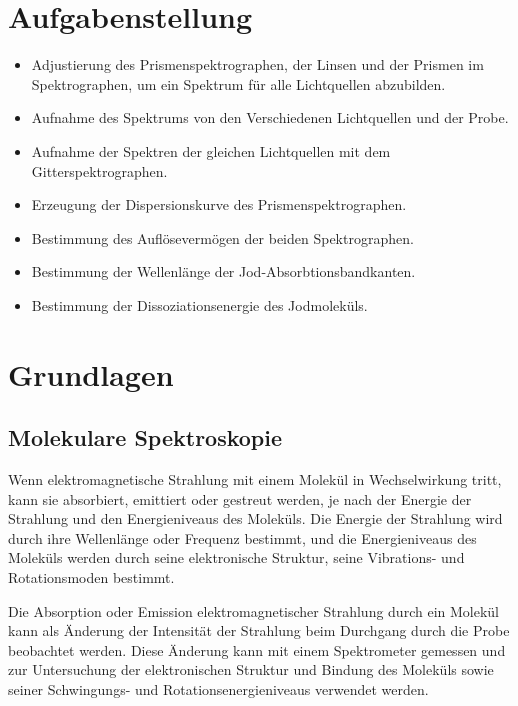 \documentclass[12pt,english,ngerman]{scrartcl}
\begin{document}
%
\section{Aufgabenstellung\label{sec:Aufgabenstellung}}

\begin{itemize}
	\item Adjustierung des Prismenspektrographen, der Linsen und der Prismen im
	      Spektrographen, um ein Spektrum für alle Lichtquellen abzubilden.
	\item Aufnahme des Spektrums von den Verschiedenen Lichtquellen und der Probe.
	\item Aufnahme der Spektren der gleichen Lichtquellen mit dem Gitterspektrographen.
	\item Erzeugung der Dispersionskurve des Prismenspektrographen.
	\item Bestimmung des Auflösevermögen der beiden Spektrographen.
	\item Bestimmung der Wellenlänge der Jod-Absorbtionsbandkanten.
	\item Bestimmung der Dissoziationsenergie des Jodmoleküls.
\end{itemize}

\section{Grundlagen}\label{sec:Grund}

\subsection{Molekulare Spektroskopie}

Wenn elektromagnetische Strahlung mit einem Molekül in Wechselwirkung tritt,
kann sie absorbiert, emittiert oder gestreut werden, je nach der Energie der
Strahlung und den Energieniveaus des Moleküls. Die Energie der Strahlung wird
durch ihre Wellenlänge oder Frequenz bestimmt, und die Energieniveaus des
Moleküls werden durch seine elektronische Struktur, seine Vibrations- und
Rotationsmoden bestimmt.

Die Absorption oder Emission elektromagnetischer Strahlung durch ein Molekül
kann als Änderung der Intensität der Strahlung beim Durchgang durch die Probe
beobachtet werden. Diese Änderung kann mit einem Spektrometer gemessen und zur
Untersuchung der elektronischen Struktur und Bindung des Moleküls sowie seiner
Schwingungs- und Rotationsenergieniveaus verwendet werden.
\end{document}
